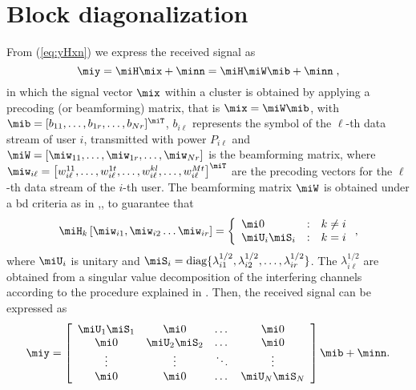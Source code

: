 \section{Block diagonalization}\label{ChannelModel}

From (\ref{eq:yHxn}) we express the received signal as
\begin{equation}
    \miy=\miH\mix+ \minn =\miH\miW\mib+ \minn \;,\label{eq_yHxn}
\end{equation}
in which the signal vector $\mix$ within a cluster is obtained by applying a precoding (or beamforming) matrix, that is
 $\mix= \miW\mib$, with $\mib=[b_{11},\dots,b_{1r},\dots,b_{Nr}]^\miT$, $b_{i\ell}$
represents the symbol of the $\ell$-th data stream of user $i$, transmitted with power $P_{i\ell}$ and
$\miW=[\miw_{11},\dots,\miw_{1r},\dots,\miw_{Nr}]$ is the
beamforming matrix, where $\miw_{i\ell}=\left[w^{11}_{i\ell},\dots,w^{1t}_{i\ell},\dots,w^{kl}_{i\ell},\dots,w^{Mt}_{i\ell}\right]^\miT$
are the precoding vectors for the $\ell$-th data stream of the $i$-th
user. The beamforming matrix $\miW$ is obtained under a \gls{bd} criteria as in
\cite{karakayali06},\cite{armada11b}, to guarantee that
\begin{equation}
\label{eq:3}
\begin{split}
     &\miH_k \left[\miw_{i1},\miw_{i2}\dots \miw_{ir}\right]
         =\left \{\begin{array}{lcl}\mi0 &: & k\neq i\\ \miU_i\miS_i &: & k=i \end{array}\right .,\\
\end{split}
\end{equation}
where $\miU_i$ is unitary and
$\miS_i=\text{diag}\{\lambda_{i1}^{1/2},\lambda_{i2}^{1/2},\dots,\lambda_{ir}^{1/2}\}$.
The $\lambda_{i\ell}^{1/2}$ are obtained from a singular value decomposition of the interfering channels according to the procedure explained in \cite{armada11b}. Then, the received signal can be expressed as
\begin{equation}
\label{eq:4} \miy=\left [\begin{array}{cccc}
\miU_1\miS_1 & \mi0 &\dots & \mi0\\
\mi0 & \miU_2\miS_2 &\dots & \mi0\\
\vdots & \vdots &\ddots & \vdots\\
\mi0 & \mi0 &\dots & \miU_N\miS_N\\
\end{array}\right ]\mib+ \minn .
\end{equation}
